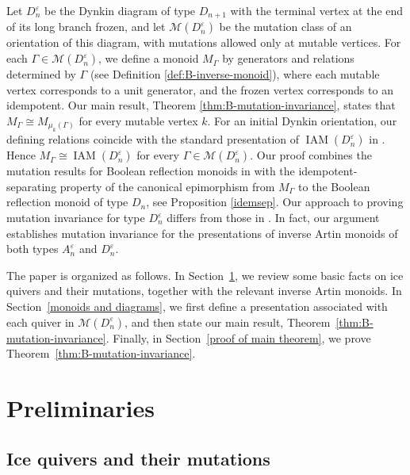 \documentclass[a4paper, 12pt, reqno]{amsart}
\theoremstyle{definition}
\newcommand{\eps}{\varepsilon}
\begin{document}
Let $D_n^\varepsilon$ be the Dynkin diagram of type $D_{n+1}$ with the terminal vertex at the end of its long branch frozen, and let $\mathcal{M}(D_n^\varepsilon)$ be the mutation class of an orientation of this diagram, with mutations allowed only at mutable vertices. For each $\Gamma\in\mathcal{M}(D_n^\varepsilon)$, we define a monoid $M_\Gamma$ by generators and relations determined by $\Gamma$ (see Definition \ref{def:B-inverse-monoid}), where each mutable vertex corresponds to a unit generator, and the frozen vertex corresponds to an idempotent. Our main result, Theorem \ref{thm:B-mutation-invariance}, states that $M_\Gamma\cong M_{\mu_k(\Gamma)}$ for every mutable vertex $k$. For an initial Dynkin orientation, our defining relations coincide with the standard presentation of $\operatorname{IAM}(D_n^\eps)$ in \cite{Duan2025}. Hence $M_\Gamma\cong\operatorname{IAM}(D_n^\eps)$ for every $\Gamma\in\mathcal M(D_n^\eps)$. Our proof combines the mutation results for Boolean reflection monoids in \cite[Definition 4.5 and Theorems 4.7 and 4.9]{DLL2020} with the idempotent-separating property of the canonical epimorphism from $M_\Gamma$ to the Boolean reflection monoid of type $D_n$, see Proposition \ref{idemsep}. Our approach to proving mutation invariance for type $D_n^\varepsilon$ differs from those in \cite{Duan2025,DL25}. In fact, our argument establishes mutation invariance for the presentations of inverse Artin monoids of both types $A_n^\varepsilon$ and $D_n^\varepsilon$.

The paper is organized as follows. In Section~\ref{sec:preliminaries}, we review some basic facts on ice quivers and their mutations, together with the relevant inverse Artin monoids. In Section~\ref{monoids and diagrams}, we first define a presentation associated with each quiver in $\mathcal{M}(D_n^\varepsilon)$, and then state our main result, Theorem~\ref{thm:B-mutation-invariance}. Finally, in Section~\ref{proof of main theorem}, we prove Theorem~\ref{thm:B-mutation-invariance}.


\section{Preliminaries}\label{sec:preliminaries}

\subsection{Ice quivers and their mutations}\label{Ice quivers and their mutations}
\end{document}
